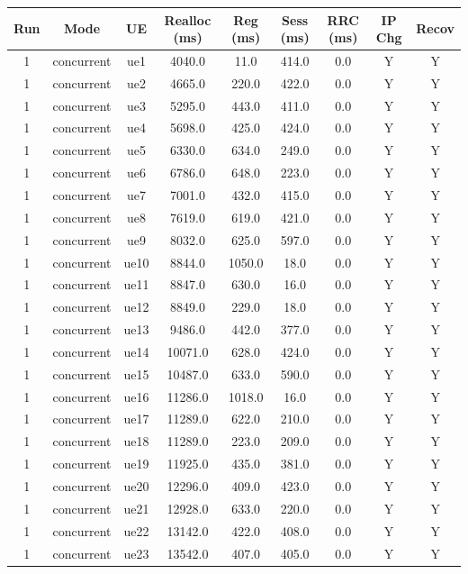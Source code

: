 \begin{table}[ht]
\centering
\begin{tabular}{|c|c|c|c|c|c|c|c|c|}
\hline
Run & Mode & UE & Realloc (ms) & Reg (ms) & Sess (ms) & RRC (ms) & IP Chg & Recov \\
\hline
1 & concurrent & ue1 & 4040.0 & 11.0 & 414.0 & 0.0 & Y & Y \\
1 & concurrent & ue2 & 4665.0 & 220.0 & 422.0 & 0.0 & Y & Y \\
1 & concurrent & ue3 & 5295.0 & 443.0 & 411.0 & 0.0 & Y & Y \\
1 & concurrent & ue4 & 5698.0 & 425.0 & 424.0 & 0.0 & Y & Y \\
1 & concurrent & ue5 & 6330.0 & 634.0 & 249.0 & 0.0 & Y & Y \\
1 & concurrent & ue6 & 6786.0 & 648.0 & 223.0 & 0.0 & Y & Y \\
1 & concurrent & ue7 & 7001.0 & 432.0 & 415.0 & 0.0 & Y & Y \\
1 & concurrent & ue8 & 7619.0 & 619.0 & 421.0 & 0.0 & Y & Y \\
1 & concurrent & ue9 & 8032.0 & 625.0 & 597.0 & 0.0 & Y & Y \\
1 & concurrent & ue10 & 8844.0 & 1050.0 & 18.0 & 0.0 & Y & Y \\
1 & concurrent & ue11 & 8847.0 & 630.0 & 16.0 & 0.0 & Y & Y \\
1 & concurrent & ue12 & 8849.0 & 229.0 & 18.0 & 0.0 & Y & Y \\
1 & concurrent & ue13 & 9486.0 & 442.0 & 377.0 & 0.0 & Y & Y \\
1 & concurrent & ue14 & 10071.0 & 628.0 & 424.0 & 0.0 & Y & Y \\
1 & concurrent & ue15 & 10487.0 & 633.0 & 590.0 & 0.0 & Y & Y \\
1 & concurrent & ue16 & 11286.0 & 1018.0 & 16.0 & 0.0 & Y & Y \\
1 & concurrent & ue17 & 11289.0 & 622.0 & 210.0 & 0.0 & Y & Y \\
1 & concurrent & ue18 & 11289.0 & 223.0 & 209.0 & 0.0 & Y & Y \\
1 & concurrent & ue19 & 11925.0 & 435.0 & 381.0 & 0.0 & Y & Y \\
1 & concurrent & ue20 & 12296.0 & 409.0 & 423.0 & 0.0 & Y & Y \\
1 & concurrent & ue21 & 12928.0 & 633.0 & 220.0 & 0.0 & Y & Y \\
1 & concurrent & ue22 & 13142.0 & 422.0 & 408.0 & 0.0 & Y & Y \\
1 & concurrent & ue23 & 13542.0 & 407.0 & 405.0 & 0.0 & Y & Y \\

\end{tabular}
\end{table}
